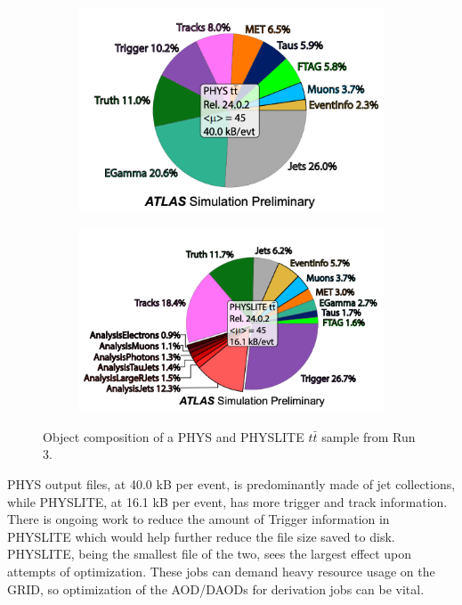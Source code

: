\begin{figure}[h]
    \centering
    \begin{subfigure}{.5\textwidth}
        \centering
        \includegraphics[width=\textwidth]{content/img/tt_PHYS.png}
        \label{fig:IO_tt_PHYS_subA}
      \end{subfigure}%
      \begin{subfigure}{.5\textwidth}
        \centering
        \includegraphics[width=\textwidth]{content/img/tt_PHYSLITE.png}
        \label{fig:IO_tt_PHYSLITE_subB}
      \end{subfigure}%
    \caption{Object composition of a PHYS and PHYSLITE $t\bar{t}$ sample from Run 3.}
    \label{fig:IO_tt_PHYS_vs_PHYSLITE}
\end{figure}
PHYS output files, at 40.0 kB per event, is predominantly made of jet collections, while PHYSLITE, at 16.1 kB per event, has more trigger and track information.
There is ongoing work to reduce the amount of Trigger information in PHYSLITE which would help further reduce the file size saved to disk.
PHYSLITE, being the smallest file of the two, sees the largest effect upon attempts of optimization. 
These jobs can demand heavy resource usage on the GRID, so optimization of the AOD/DAODs for derivation jobs can be vital. 

